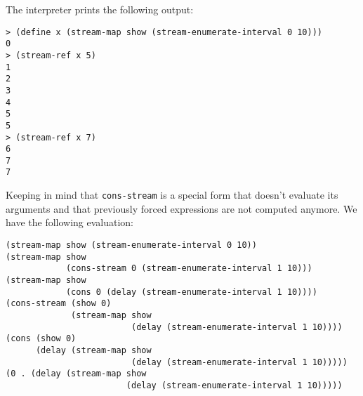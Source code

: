 \documentclass[a4paper,12pt]{article}
\begin{document}
The interpreter prints the following output:
\begin{verbatim}
> (define x (stream-map show (stream-enumerate-interval 0 10)))
0
> (stream-ref x 5)
1
2
3
4
5
5
> (stream-ref x 7)
6
7
7
\end{verbatim}
Keeping in mind that \lstinline!cons-stream! is a special form that
doesn't evaluate its arguments and that previously forced expressions
are not computed anymore.  We have the following evaluation:
\begin{lstlisting}
(stream-map show (stream-enumerate-interval 0 10))
(stream-map show
            (cons-stream 0 (stream-enumerate-interval 1 10)))
(stream-map show
            (cons 0 (delay (stream-enumerate-interval 1 10))))
(cons-stream (show 0)
             (stream-map show
                         (delay (stream-enumerate-interval 1 10))))
(cons (show 0)
      (delay (stream-map show
                         (delay (stream-enumerate-interval 1 10)))))
(0 . (delay (stream-map show
                        (delay (stream-enumerate-interval 1 10)))))
\end{lstlisting}
\end{document}
